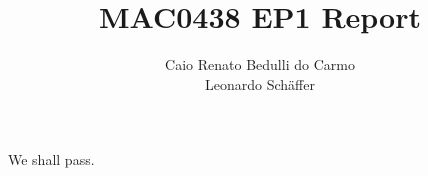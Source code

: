 \documentclass[12pt,a4paper]{article}
\title{MAC0438 EP1 Report}
\author{Caio Renato Bedulli do Carmo\\Leonardo Schäffer}
\date{}
\begin{document}
\maketitle

We shall pass.
\end{document}
